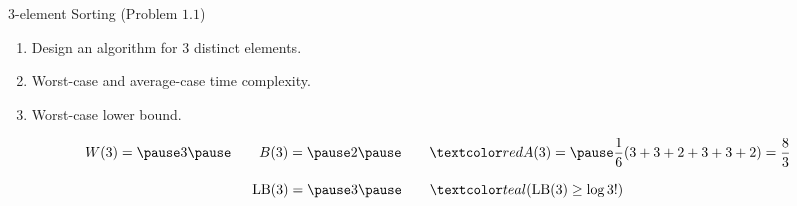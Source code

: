 % 
% 

\begin{frame}{}
  \begin{exampleblock}{$3$-element Sorting (Problem $1.1$)}
    \begin{enumerate}[(1)]
      \item Design an algorithm for  $3$ distinct elements.
      \item Worst-case and average-case time complexity.
      \item Worst-case lower bound.
    \end{enumerate}
  \end{exampleblock}

  \pause

  \pause
  \vspace{-0.30cm}
  \[
    W(3) =\pause 3 \pause\qquad B(3) =\pause 2 \pause\qquad \red{A(3)} = \pause \frac{1}{6} (3+3+2+3+3+2) = \frac{8}{3}
  \]

  \pause
  \vspace{-0.60cm}
  \[
    \text{LB}(3) =\pause 3 \pause \qquad \teal{(\text{LB}(3) \ge \log 3!)}
  \]
\end{frame}

